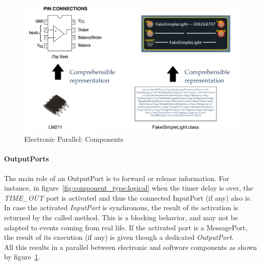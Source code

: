 \begin{figure}
\centering
	\includegraphics[width=.8\textwidth]{part2/pics/ComponentView.pdf}
	\caption{Electronic Parallel: Components}
  	\label{fig:elecComponent}
\end{figure}


\paragraph{OutputPorts}
The main role of an OutputPort is to forward or release information. For instance, in figure~\ref{fig:component_type:logical} when the timer delay is over, the \textit{TIME\_OUT} port is activated and thus the connected InputPort (if any) also is. In case the activated \textit{InputPort} is synchronous, the result of its activation is returned by the called method. This is a blocking behavior, and may not be adapted to events coming from real life. If the activated port is a MessagePort, the result of its execution (if any) is given though a dedicated \textit{OutputPort}.\\

All this results in a parallel between electronic and software components as shown by figure~\ref{fig:elecComponent}.\\

